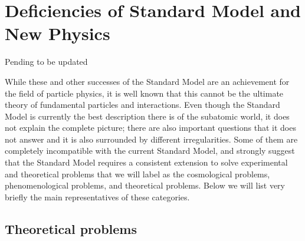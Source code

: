 
\section{Deficiencies of Standard Model and New Physics}

{\Large Pending to be updated} %

While these and other successes of the Standard Model are an achievement for the field of particle physics, it is well known that this cannot be the ultimate theory of fundamental particles and interactions. Even though the Standard Model is currently the best description there is of the subatomic world, it does not explain the complete picture; there are also important questions that it does not answer and it is also surrounded by different irregularities. Some of them are completely incompatible with the current Standard Model, and strongly suggest that the Standard Model requires a consistent extension to solve experimental and theoretical problems that we will label as the cosmological problems, phenomenological problems, and theoretical problems. Below we will list very briefly the main representatives of these categories.



\subsection{Theoretical problems}

